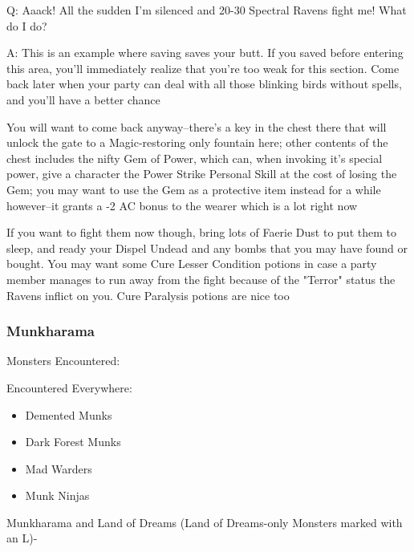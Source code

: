 \documentclass[12pt]{article}
\providecommand{\tightlist}{%
  \setlength{\itemsep}{0pt}\setlength{\parskip}{0pt}}
\begin{document}
Q: Aaack! All the sudden I'm silenced and 20-30 Spectral Ravens fight
me! What do I do?

A: This is an example where saving saves your butt. If you saved before
entering this area, you'll immediately realize that you're too weak for
this section. Come back later when your party can deal with all those
blinking birds without spells, and you'll have a better chance

You will want to come back anyway--there's a key in the chest there that
will unlock the gate to a Magic-restoring only fountain here; other contents
of the chest includes the nifty Gem of Power, which can, when invoking it's
special power, give a character the Power Strike Personal Skill at the cost
of losing the Gem; you may want to use the Gem as a protective item
instead for a while however--it grants a -2 AC bonus to the wearer which is
a lot right now

If you want to fight them now though, bring lots of Faerie Dust to put them
to sleep, and ready your Dispel Undead and any bombs that you may have found
or bought.  You may want some Cure Lesser Condition potions in case a party
member manages to run away from the fight because of the "Terror" status the
Ravens inflict on you.  Cure Paralysis potions are nice too

\subsubsection{Munkharama}\label{munkharama}

Monsters Encountered:

Encountered Everywhere:

\begin{itemize}
\tightlist
\item
  Demented Munks
\item
  Dark Forest Munks
\item
  Mad Warders
\item
  Munk Ninjas
\end{itemize}

Munkharama and Land of Dreams (Land of Dreams-only Monsters marked with
an L)-
\end{document}
